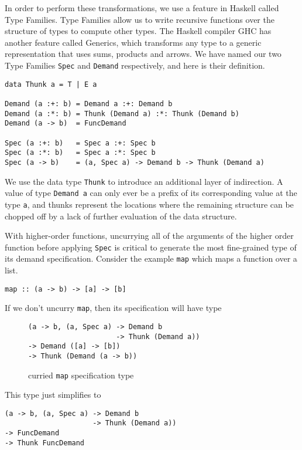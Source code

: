 \documentclass{article}
\begin{document}
In order to perform these transformations, we use a feature in Haskell called
Type Families. Type Families allow us to write recursive functions over the
structure of types to compute other types. The Haskell compiler GHC has another
feature called Generics, which transforms any type to a generic representation
that uses sums, products and arrows. We have named our two Type Families
\verb|Spec| and \verb|Demand| respectively, and here is their definition.

\begin{verbatim}
data Thunk a = T | E a

Demand (a :+: b) = Demand a :+: Demand b
Demand (a :*: b) = Thunk (Demand a) :*: Thunk (Demand b)
Demand (a -> b)  = FuncDemand

Spec (a :+: b)   = Spec a :+: Spec b
Spec (a :*: b)   = Spec a :*: Spec b
Spec (a -> b)    = (a, Spec a) -> Demand b -> Thunk (Demand a)
\end{verbatim}

We use the data type \verb|Thunk| to introduce an additional layer of
indirection. A value of type \verb|Demand a| can only ever be a prefix of its
corresponding value at the type \verb|a|, and thunks represent the locations
where the remaining structure can be chopped off by a lack of further evaluation
of the data structure.

With higher-order functions, uncurrying all of the arguments of the higher order
function before applying \verb|Spec| is critical to generate the most
fine-grained type of its demand specification. Consider the example \verb|map|
which maps a function over a list.
\begin{verbatim}
map :: (a -> b) -> [a] -> [b]
\end{verbatim}

If we don't uncurry \verb|map|, then its specification will have type
\begin{figure}[H]
  \centering
\begin{verbatim}
(a -> b, (a, Spec a) -> Demand b
                     -> Thunk (Demand a))
-> Demand ([a] -> [b])
-> Thunk (Demand (a -> b))
\end{verbatim}
\caption{curried \texttt{map} specification type}
\end{figure}

This type just simplifies to
\begin{verbatim}
(a -> b, (a, Spec a) -> Demand b
                     -> Thunk (Demand a))
-> FuncDemand
-> Thunk FuncDemand
\end{verbatim}
\end{document}
